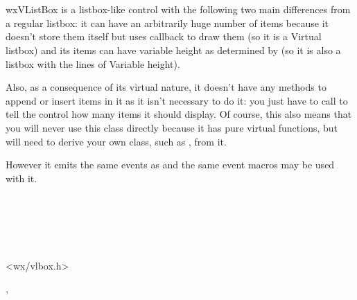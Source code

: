 
\section{}\label{wxvlistbox}

wxVListBox is a listbox-like control with the following two main differences
from a regular listbox: it can have an arbitrarily huge number of items because
it doesn't store them itself but uses 
callback to draw them (so it is a {\Large V}irtual listbox) and its items can
have variable height as determined by
 (so it is also a listbox
with the lines of {\Large V}ariable height).

Also, as a consequence of its virtual nature, it doesn't have any methods to
append or insert items in it as it isn't necessary to do it: you just have to
call  to tell the control how
many items it should display. Of course, this also means that you will never
use this class directly because it has pure virtual functions, but will need to
derive your own class, such as , from it.

However it emits the same events as  and the same
event macros may be used with it.


\\
\\
\\
\\


<wx/vlbox.h>


, 

